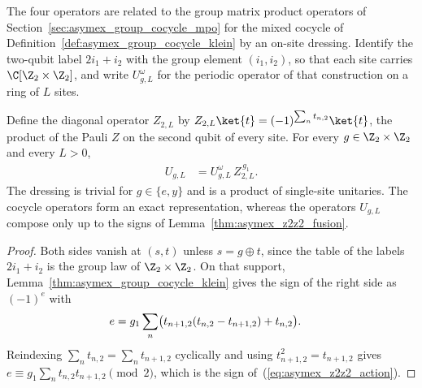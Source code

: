 The four operators are related to the group matrix product operators of
Section~\ref{sec:asymex_group_cocycle_mpo} for the mixed cocycle of
Definition~\ref{def:asymex_group_cocycle_klein} by an on-site dressing.
Identify the two-qubit label $2i_1+i_2$ with the group element
$(i_1,i_2)$, so that each site carries $\C[\Z_2\times\Z_2]$, and write
$U^{\omega}_{g,L}$ for the periodic operator of that construction on a
ring of $L$ sites.

\begin{lemma}%
    \label{thm:asymex_z2z2_group_cocycle}
    \leanok
    Define the diagonal operator $Z_{2,L}$ by
    $Z_{2,L}\ket{t}=(-1)^{\sum_nt_{n,2}}\ket{t}$, the product of the
    Pauli $Z$ on the second qubit of every site. For every
    $g\in\Z_2\times\Z_2$ and every $L>0$,
    \begin{align}
        U_{g,L}
         & =U^{\omega}_{g,L}\,Z_{2,L}^{\,g_1}.
        \label{eq:asymex_z2z2_group_cocycle}
    \end{align}
    The dressing is trivial for $g\in\{e,y\}$ and is a product of
    single-site unitaries. The cocycle operators form an exact
    representation, whereas the operators $U_{g,L}$ compose only up to
    the signs of Lemma~\ref{thm:asymex_z2z2_fusion}.
\end{lemma}

\begin{proof}
    \leanok
    Both sides vanish at $(s,t)$ unless $s=g\oplus t$, since the table
    of the labels $2i_1+i_2$ is the group law of $\Z_2\times\Z_2$. On
    that support, Lemma~\ref{thm:asymex_group_cocycle_klein} gives the
    sign of the right side as $(-1)^e$ with
    \begin{align}
        e
         & =g_1\sum_n\bigl(t_{n+1,2}(t_{n,2}-t_{n+1,2})+t_{n,2}\bigr).
        \notag
    \end{align}
    Reindexing $\sum_nt_{n,2}=\sum_nt_{n+1,2}$ cyclically and using
    $t_{n+1,2}^2=t_{n+1,2}$ gives
    $e\equiv g_1\sum_nt_{n,2}t_{n+1,2}\pmod2$, which is the sign
    of~(\ref{eq:asymex_z2z2_action}).
\end{proof}

